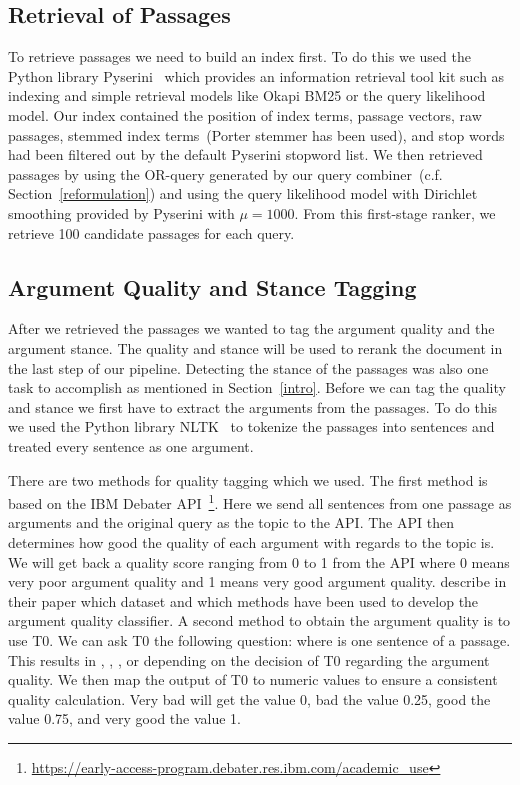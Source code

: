\subsection{Retrieval of Passages}\label{retrieval}

To retrieve passages we need to build an index first.
To do this we used the Python library Pyserini~\cite{LinMLYPN2021} which provides an information retrieval tool kit such as indexing and simple retrieval models like Okapi BM25 or the query likelihood model.
Our index contained the position of index terms, passage vectors, raw passages, stemmed index terms~(Porter stemmer has been used), and stop words had been filtered out by the default Pyserini stopword list.
We then retrieved passages by using the OR-query generated by our query combiner~(c.f. Section~\ref{reformulation}) and using the query likelihood model with Dirichlet smoothing provided by Pyserini with \( \mu = 1000 \).
From this first-stage ranker, we retrieve 100 candidate passages for each query.

\subsection{Argument Quality and Stance Tagging}

After we retrieved the passages we wanted to tag the argument quality and the argument stance.
The quality and stance will be used to rerank the document in the last step of our pipeline.
Detecting the stance of the passages was also one task to accomplish as mentioned in Section~\ref{intro}.
Before we can tag the quality and stance we first have to extract the arguments from the passages.
To do this we used the Python library NLTK~\cite{BirdLK2009} to tokenize the passages into sentences and treated every sentence as one argument.

There are two methods for quality tagging which we used.
The first method is based on the IBM Debater API~\footnote{\url{https://early-access-program.debater.res.ibm.com/academic_use}}.
Here we send all sentences from one passage as arguments and the original query as the topic to the API.
The API then determines how good the quality of each argument with regards to the topic is.
We will get back a quality score ranging from 0 to 1 from the API where 0 means very poor argument quality and 1 means very good argument quality.
\citet{ToledoG2019} describe in their paper which dataset and which methods have been used to develop the argument quality classifier.
A second method to obtain the argument quality is to use T0.
We can ask T0 the following question:  where  is one sentence of a passage.
This results in , , , or  depending on the decision of T0 regarding the argument quality.
We then map the output of T0 to numeric values to ensure a consistent quality calculation.
Very bad will get the value 0, bad the value 0.25, good the value 0.75, and very good the value 1. 

